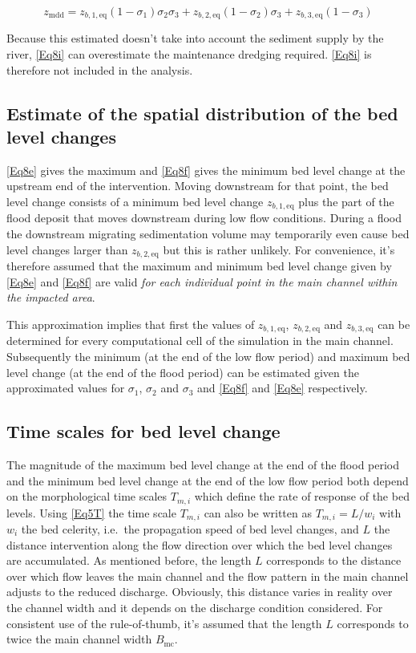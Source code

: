 \begin{equation}
z_\text{mdd} = z_{b,1,\text{eq}}(1-\sigma_1) \sigma_2 \sigma_3 + z_{b,2,\text{eq}} (1-\sigma_2) \sigma_3 + z_{b,3,\text{eq}} (1-\sigma_3)
\label{Eq8i}
\end{equation}

Because this estimated doesn't take into account the sediment supply by the river, \autoref{Eq8i} can overestimate the maintenance dredging required.
\autoref{Eq8i} is therefore not included in the \dfastmi analysis.

\subsection{Estimate of the spatial distribution of the bed level changes}

\autoref{Eq8e} gives the maximum and \autoref{Eq8f} gives the minimum bed level change at the upstream end of the intervention.
Moving downstream for that point, the bed level change consists of a minimum bed level change $z_{b,1,\text{eq}}$ plus the part of the flood deposit that moves downstream during low flow conditions.
During a flood the downstream migrating sedimentation volume may temporarily even cause bed level changes larger than $z_{b,2,\text{eq}}$ but this is rather unlikely.
For convenience, it's therefore assumed that the maximum and minimum bed level change given by \autoref{Eq8e} and \autoref{Eq8f} are valid \emph{for each individual point in the main channel within the impacted area}.

This approximation implies that first the values of $z_{b,1,\text{eq}}$, $z_{b,2,\text{eq}}$ and $z_{b,3,\text{eq}}$ can be determined for every computational cell of the simulation in the main channel.
Subsequently the minimum (at the end of the low flow period) and maximum bed level change (at the end of the flood period) can be estimated given the approximated values for $\sigma_1$, $\sigma_2$ and $\sigma_3$ and \autoref{Eq8f} and \autoref{Eq8e} respectively.

\subsection{Time scales for bed level change}

The magnitude of the maximum bed level change at the end of the flood period and the minimum bed level change at the end of the low flow period both depend on the morphological time scales $T_{m,i}$  which define the rate of response of the bed levels.
Using \autoref{Eq5T} the time scale $T_{m,i}$ can also be written as $T_{m,i} = L/w_i$ with $w_i$ the bed celerity, i.e.~the propagation speed of bed level changes, and $L$ the distance intervention along the flow direction over which the bed level changes are accumulated.
As mentioned before, the length $L$ corresponds to the distance over which flow leaves the main channel and the flow pattern in the main channel adjusts to the reduced discharge.
Obviously, this distance varies in reality over the channel width and it depends on the discharge condition considered.
For consistent use of the rule-of-thumb, it's assumed that the length $L$ corresponds to twice the main channel width $B_\text{mc}$.

